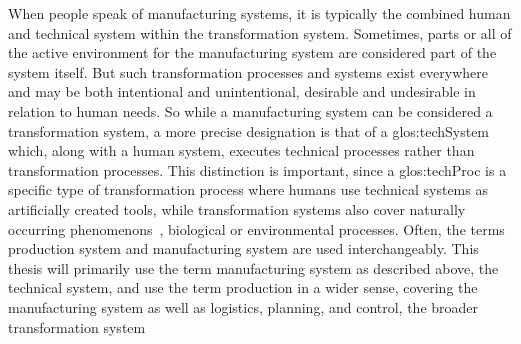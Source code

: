 When people speak of manufacturing systems, it is typically the combined human and technical system within the transformation system.
Sometimes, parts or all of the active environment for the manufacturing system are considered part of the system itself.
But such transformation processes and systems exist everywhere and may be both intentional and unintentional, desirable and undesirable in relation to human needs.
So while a manufacturing system can be considered a transformation system, a more precise designation is that of a \gls{glos:techSystem} which, along with a human system, executes technical processes rather than transformation processes.
This distinction is important, since a \gls{glos:techProc} is a specific type of transformation process where humans use technical systems as artificially created tools, while transformation systems also cover naturally occurring phenomenons~\parencite{Hubka88}, \eg{} biological or environmental processes.
Often, the terms production system and manufacturing system are used interchangeably.
This thesis will primarily use the term manufacturing system as described above, \ie{} the technical system, and use the term production in a wider sense, covering the manufacturing system as well as logistics, planning, and control, \ie{} the broader transformation system

